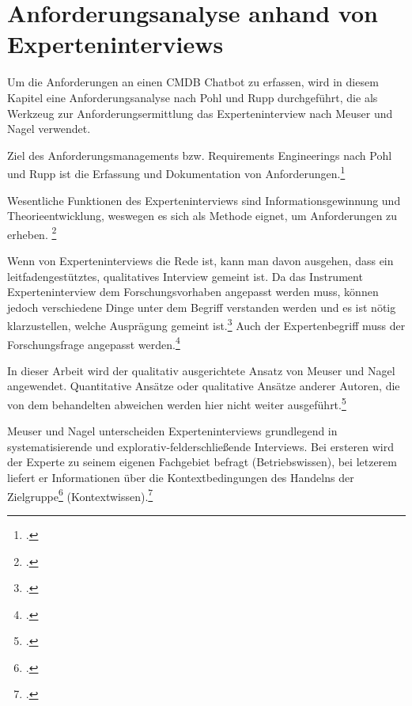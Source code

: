 \chapter{Anforderungsanalyse anhand von Experteninterviews} \label{AnfA}
Um die Anforderungen an einen \acs{CMDB} Chatbot zu erfassen, wird in diesem Kapitel eine Anforderungsanalyse nach Pohl und Rupp durchgeführt, die als Werkzeug zur Anforderungsermittlung das Experteninterview nach Meuser und Nagel verwendet.

Ziel des Anforderungsmanagements bzw. Requirements Engineerings nach Pohl und Rupp ist die Erfassung und Dokumentation von Anforderungen.\footcite[Vgl.][3]{Pohl_2015_Requirements}

Wesentliche Funktionen des Experteninterviews sind Informationsgewinnung und Theorieentwicklung, weswegen es sich als Methode eignet, um Anforderungen zu erheben.
\footcites[Vgl.][9]{Bogner_2014_Interview}[Vgl.][187\psq]{Glaeser_2010_Inhaltsanalyse}

Wenn von Experteninterviews die Rede ist, kann man davon ausgehen, dass ein leitfadengestütztes, qualitatives Interview gemeint ist. Da das Instrument Experteninterview dem Forschungsvorhaben angepasst werden muss, können jedoch verschiedene Dinge unter dem Begriff verstanden werden und es ist nötig klarzustellen, welche Ausprägung gemeint ist.\footcite[Vgl.][3]{Bogner_2014_Interview}
Auch der Expertenbegriff muss der Forschungsfrage angepasst werden.\footcite[Vgl.][180]{Meuser_1994_Interview}

In dieser Arbeit wird der qualitativ ausgerichtete Ansatz von Meuser und Nagel angewendet. Quantitative Ansätze oder qualitative Ansätze anderer Autoren, die von dem behandelten abweichen werden hier nicht weiter ausgeführt.\footcite[Vgl.][o. \pno]{Meuser_2010_Interview}

Meuser und Nagel unterscheiden Experteninterviews grundlegend in systematisierende und explorativ-felderschließende Interviews. Bei ersteren wird der Experte zu seinem eigenen Fachgebiet befragt (Betriebswissen), bei letzerem liefert er \glqq{}Informationen über die Kontextbedingungen des Handelns der Zielgruppe\grqq\footcite[][445]{Meuser_1991_Interview} (Kontextwissen).\footcite[Vgl.][445]{Meuser_1991_Interview}

